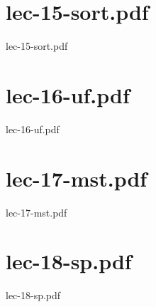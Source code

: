 \documentclass[aspectratio = 169]{beamer}
\begin{document}
\section{lec-15-sort.pdf}
\begin{frame}{lec-15-sort.pdf}
\end{frame}

\section{lec-16-uf.pdf}
\begin{frame}{lec-16-uf.pdf}
\end{frame}

\section{lec-17-mst.pdf}
\begin{frame}{lec-17-mst.pdf}
\end{frame}

\section{lec-18-sp.pdf}
\begin{frame}{lec-18-sp.pdf}
\end{frame}

\newpage
\end{document}
